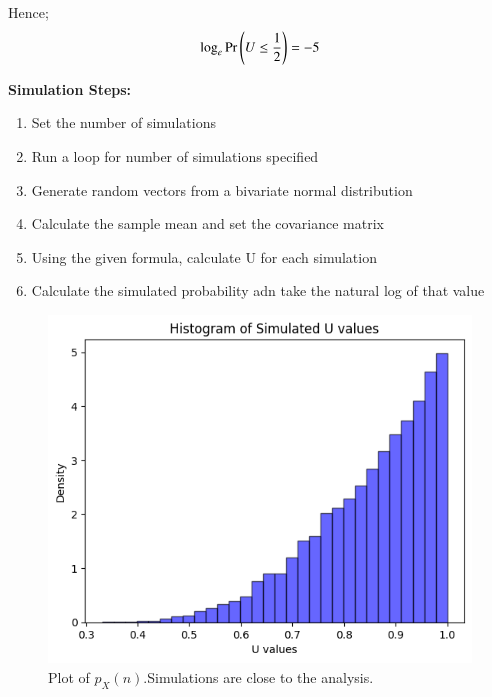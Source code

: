 \documentclass[journal,12pt,onecolumn]{IEEEtran}
\theoremstyle{remark}
\begin{document}
Hence;
\begin{align}
    \log_e \Pr\left(U \le \frac{1}{2}\right) = -5
\end{align}

\textbf{Simulation Steps:}
\begin{enumerate}
    \item Set the number of simulations
    \item Run a loop for number of simulations specified
    \item Generate random vectors from a bivariate normal distribution
    \item Calculate the sample mean and set the covariance matrix
    \item Using the given formula, calculate U for each simulation
    \item Calculate the simulated probability adn take the natural log of that value
\end{enumerate}

\begin{figure}[!ht]
    \centering
    \includegraphics[width=\columnwidth]{./figs/sim.png}
    \caption{Plot of $p_X(n)$.Simulations are close to the analysis. }
    \end{figure}
\end{document}
